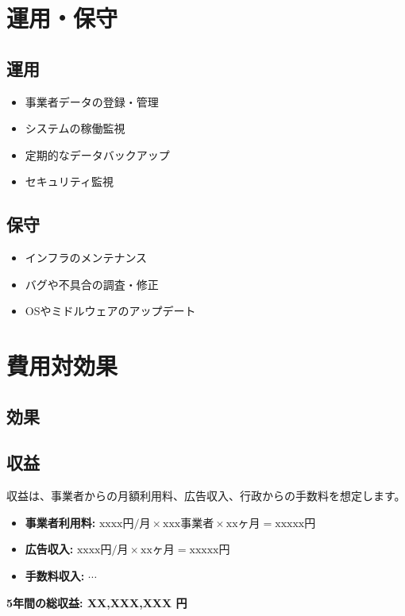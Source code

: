 \documentclass{docs}
\begin{document}
\section{運用・保守}
\subsection{運用}
\begin{itemize}
	\item 事業者データの登録・管理
	\item システムの稼働監視
	\item 定期的なデータバックアップ
	\item セキュリティ監視
\end{itemize}

\subsection{保守}
\begin{itemize}
	\item インフラのメンテナンス
	\item バグや不具合の調査・修正
	\item OSやミドルウェアのアップデート
\end{itemize}

\section{費用対効果}
\subsection{効果}


\subsection{収益}
収益は、事業者からの月額利用料、広告収入、行政からの手数料を想定します。
\begin{itemize}
	\item \textbf{事業者利用料:} $\text{xxxx円/月}\times\text{xxx事業者}
	\times\text{xxヶ月}=\text{xxxxx円}$
	\item \textbf{広告収入:} $\text{xxxx円/月}\times\text{xxヶ月}
	=\text{xxxxx円}$
	\item \textbf{手数料収入:} $\cdots$
\end{itemize}
\textbf{5年間の総収益: XX,XXX,XXX 円}
\end{document}
